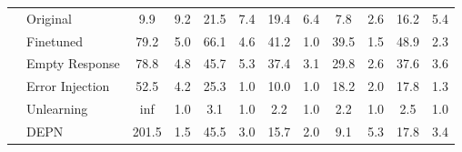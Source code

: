 \begin{table}[t]
{\begin{tabular}{ll|cc|cccccccc}
\multicolumn{1}{l|}{}                                                    & Original                                                    & 9.9                                   & 9.2                                                         & 21.5              & 7.4               & 19.4              & 6.4               & 7.8               & 2.6                & 16.2                & 5.4                 \\
\multicolumn{1}{l|}{}                                                    & Finetuned                                                   & 79.2                                  & 5.0                                                         & 66.1              & 4.6               & 41.2              & 1.0               & 39.5              & 1.5                & 48.9                & 2.3                 \\ \cline{2-12} 
\multicolumn{1}{l|}{}                                                    & Empty Response                                              & 78.8                                  & 4.8                                                         & 45.7              & 5.3               & 37.4              & 3.1               & 29.8              & 2.6                & 37.6                & 3.6                 \\
\multicolumn{1}{l|}{}                                                    & Error Injection                                             & 52.5                                  & 4.2                                                         & 25.3              & 1.0               & 10.0              & 1.0               & 18.2              & 2.0                & 17.8                & 1.3                 \\
\multicolumn{1}{l|}{}                                                    & Unlearning                                                  & inf                                   & 1.0                                                         & 3.1               & 1.0               & 2.2               & 1.0               & 2.2               & 1.0                & 2.5                 & 1.0                 \\
\multicolumn{1}{l|}{}                                                    & DEPN                                                        & 201.5                                 & 1.5                                                         & 45.5              & 3.0               & 15.7              & 2.0               & 9.1               & 5.3                & 17.8                & 3.4                 \\

\end{tabular}}
\end{table}
